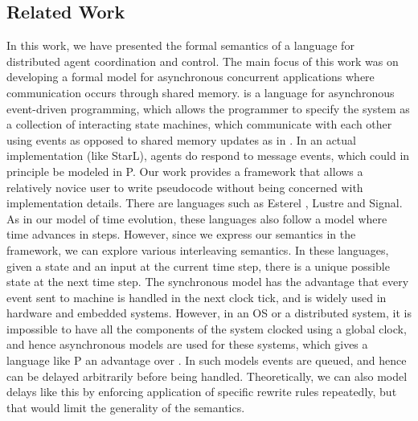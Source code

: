 \subsection{Related Work}
\label{sect:rel}
In this work, we have presented the formal semantics of a  language for distributed agent coordination and control. The main focus of this work was on developing a formal model for asynchronous concurrent applications where communication occurs through shared memory. \cite{P} is a language for asynchronous event-driven programming, which allows the programmer to specify the system as a collection of interacting state machines, which communicate with each other using events as opposed to shared memory updates as in \rolang. In an actual implementation (like StarL), agents do respond to message events, which could in principle be modeled in P. Our work provides  a framework that allows a relatively novice user to write pseudocode without being concerned with implementation details.
There are languages such as Esterel \cite{esterel} , Lustre \cite{lustre} and Signal\cite{signal}. As in our model of time evolution, these languages also follow a model where time
advances in steps. However, since we express our semantics in the \K framework, we can explore various interleaving semantics. In these languages, given
a state and an input at the current time step, there is a unique possible
state at the next time step. 
The synchronous model has the advantage that every event
sent to machine is handled in the next clock tick, and is widely
used in hardware and embedded systems. However, in an OS or a
distributed system, it is impossible to have all the components of
the system clocked using a global clock, and hence asynchronous
models are used for these systems, which gives a language like P an advantage over \rolang. In such models events are
queued, and hence can be delayed arbitrarily before being handled. Theoretically, we can also model delays like this by enforcing application of specific rewrite rules repeatedly, but that would limit the generality of the semantics. 
